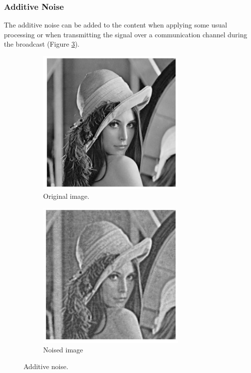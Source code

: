 \subsubsection{Additive Noise}
The additive noise can be added to the content when applying some usual processing or when transmitting the signal over a communication channel during the broadcast (Figure \ref{noise}). 

\begin{figure}[h!]
\centering
\begin{subfigure}[]{0.4\textwidth}
\centering
\includegraphics[width=0.8\textwidth]{./img/lena2.jpg}
\caption{\small{Original image.}}
\label{fig:noise1}
\end{subfigure}%
\begin{subfigure}[]{0.4\textwidth}
\centering
\includegraphics[width=0.8\textwidth]{./img/noise.jpg}
\caption{\small{Noised image}}
\label{fig:noise2}
\end{subfigure}%
\caption{\small{Additive noise.}\label{noise}}
\end{figure}

